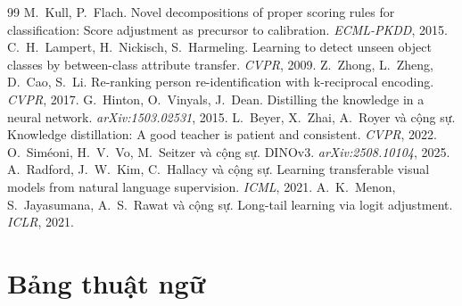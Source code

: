 \documentclass[11pt,a4paper]{article}
\begin{document}
\begin{thebibliography}{99}
 M.~Kull, P.~Flach. Novel decompositions of proper scoring rules for classification: Score adjustment as precursor to calibration. \textit{ECML-PKDD}, 2015.
 C.~H.~Lampert, H.~Nickisch, S.~Harmeling. Learning to detect unseen object classes by between-class attribute transfer. \textit{CVPR}, 2009.
 Z.~Zhong, L.~Zheng, D.~Cao, S.~Li. Re-ranking person re-identification with k-reciprocal encoding. \textit{CVPR}, 2017.
 G.~Hinton, O.~Vinyals, J.~Dean. Distilling the knowledge in a neural network. \textit{arXiv:1503.02531}, 2015.
 L.~Beyer, X.~Zhai, A.~Royer và cộng sự. Knowledge distillation: A good teacher is patient and consistent. \textit{CVPR}, 2022.
 O.~Siméoni, H.~V.~Vo, M.~Seitzer và cộng sự. DINOv3. \textit{arXiv:2508.10104}, 2025.
 A.~Radford, J.~W.~Kim, C.~Hallacy và cộng sự. Learning transferable visual models from natural language supervision. \textit{ICML}, 2021.
 A.~K.~Menon, S.~Jayasumana, A.~S.~Rawat và cộng sự. Long-tail learning via logit adjustment. \textit{ICLR}, 2021.
\end{thebibliography}

\appendix
\section{Bảng thuật ngữ}
\label{app:glossary}
\end{document}
